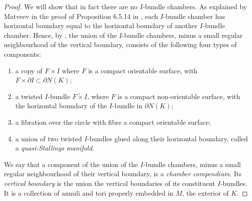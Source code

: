 \documentclass[oneside]{amsart}
\numberwithin{equation}{section}
\theoremstyle{plain}
\theoremstyle{definition}
\begin{document}
\begin{proof}
We will show that in fact there are no $I$-bundle chambers. As explained by Matveev in the proof of Proposition 6.5.14 in \cite{Matveev}, each $I$-bundle chamber has horizontal boundary equal to the horizontal boundary of another $I$-bundle chamber. Hence, by \cite[Proposition 6.5.14]{Matveev}, the union of the $I$-bundle chambers, minus a small regular neighbourhood of the vertical boundary, consists of the following four types of components:
\begin{enumerate}
\item a copy of $F \times I$ where $F$ is a compact orientable surface, with $F \times \partial I \subset \partial N(K)$;
\item a twisted $I$-bundle $F \tilde \times I$, where $F$ is a compact non-orientable surface, with the horizontal boundary of the $I$-bundle in $\partial N(K)$;
\item a fibration over the circle with fibre a compact orientable surface;
\item a union of two twisted $I$-bundles glued along their horizontal boundary, called a \emph{quasi-Stallings manifold}.
\end{enumerate}
We say that a component of the union of the $I$-bundle chambers, minus a small regular neighbourhood of their vertical boundary, is a \emph{chamber compendium}. Its \emph{vertical boundary} is the union the vertical boundaries of its constituent $I$-bundles. It is a collection of annuli and tori properly embedded in $M$, the exterior of $K$.


\end{proof}
\end{document}
